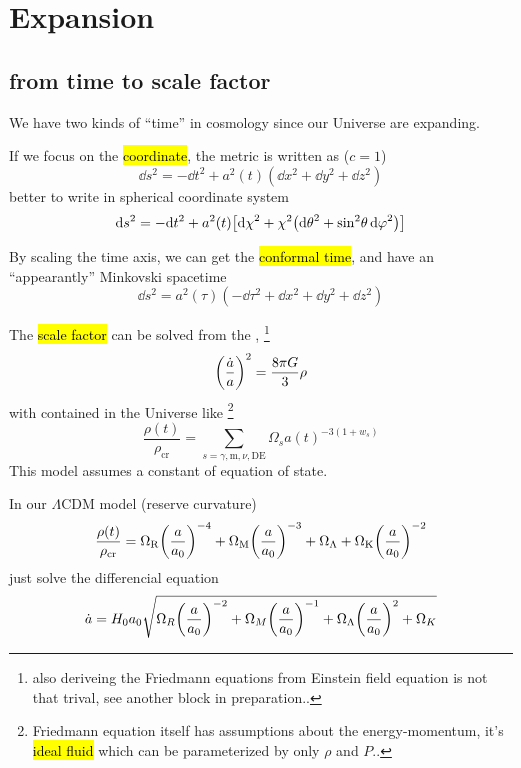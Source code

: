 
\section{Expansion}

\subsection{from time to scale factor}

We have two kinds of ``time'' in cosmology since our Universe are expanding. 

If we focus on the \hl{coordinate}, the metric is written as ($c=1$)
\begin{equation}
    \dd s^2 = -\dd t^2 + a^2(t) (\dd x^2 + \dd y^2 + \dd z^2)
\end{equation}
better to write in spherical coordinate system
\begin{equation}
    \dd s^2 = -\dd t^2 + a^2(t) \qty[{\dd{\chi}}^2 + \chi^2 \qty(\dd{\theta}^2 + {\sin}^2{\theta} \dd{\varphi}^2) ]
\end{equation}

By scaling the time axis, we can get the \hl{conformal time}, 
and have an ``appearantly'' Minkovski spacetime
\begin{equation}
    \dd s^2 = a^2(\tau) (-\dd \tau^2 + \dd x^2 + \dd y^2 + \dd z^2)
\end{equation}

The \hl{scale factor} can be solved from the , 
\footnote{also deriveing the Friedmann equations from Einstein field equation is not that trival, see another block in preparation..}
\begin{equation}  \label{eq:Friedmann1}
    {\qty(\frac{\dot{a}}{a})}^2 = \frac{8\pi G}{3} \rho
\end{equation}
with  contained in the Universe like 
\footnote{Friedmann equation itself has assumptions about the energy-momentum, it's \hl{ideal fluid} which can be parameterized by only $\rho$ and $P$..}
\begin{equation}
    \frac{\rho(t)}{\rho_{\mathrm{cr}}} = \sum_{s=\gamma, \mathrm{m}, \nu, \mathrm{DE}} \Omega_{s} {a(t)}^{-3 (1 + w_{s})} 
\end{equation}
This model assumes a constant of equation of state. 


In our $\Lambda$CDM model (reserve curvature)
\begin{equation} \label{eq:LCDM}
    \frac{\rho(t)}{\rho_{\mathrm{cr}}} = \Omega_{\mathrm{R}} {\qty(\frac{a}{a_0})}^{-4} + \Omega_{\mathrm{M}} {\qty(\frac{a}{a_0})}^{-3} + \Omega_\Lambda + \Omega_{\mathrm{K}} {\qty(\frac{a}{a_0})}^{-2}
\end{equation}
just solve the differencial equation
\begin{equation}
    \dot{a} = H_0 a_0 \sqrt{\Omega_R {\qty(\frac{a}{a_0})}^{-2} + \Omega_M {\qty(\frac{a}{a_0})}^{-1} + \Omega_\Lambda{\qty(\frac{a}{a_0})}^{2} + \Omega_K}
\end{equation}

